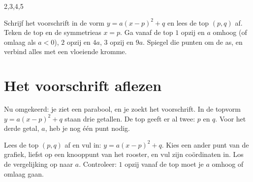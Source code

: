 \begin{alleenvoor}{2,3,4,5}
\begin{werkwijze}
Schrijf het voorschrift in de vorm $y = a(x - p)^2 + q$ en lees de top $(p, q)$ af. Teken de top en de symmetrieas $x = p$. Ga vanaf de top $1$ opzij en $a$ omhoog (of omlaag als $a < 0$), $2$ opzij en $4a$, $3$ opzij en $9a$. Spiegel die punten om de as, en verbind alles met een vloeiende kromme.
\end{werkwijze}

\begin{oefeningen}
\end{oefeningen}

\section{Het voorschrift aflezen}

Nu omgekeerd: je ziet een parabool, en je zoekt het voorschrift. In de topvorm $y = a(x - p)^2 + q$ staan drie getallen. De top geeft er al twee: $p$ en $q$. Voor het derde getal, $a$, heb je nog één punt nodig.


\begin{werkwijze}
Lees de top $(p, q)$ af en vul in: $y = a(x - p)^2 + q$. Kies een ander punt van de grafiek, liefst op een knooppunt van het rooster, en vul zijn coördinaten in. Los de vergelijking op naar $a$. Controleer: $1$ opzij vanaf de top moet je $a$ omhoog of omlaag gaan.
\end{werkwijze}


\end{alleenvoor}
